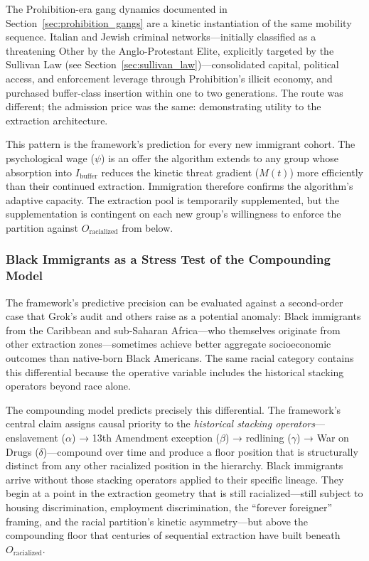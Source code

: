 The Prohibition-era gang dynamics documented in Section~\ref{sec:prohibition_gangs} are a kinetic instantiation of the same mobility sequence. Italian and Jewish criminal networks---initially classified as a threatening Other by the Anglo-Protestant Elite, explicitly targeted by the Sullivan Law (see Section~\ref{sec:sullivan_law})---consolidated capital, political access, and enforcement leverage through Prohibition's illicit economy, and purchased buffer-class insertion within one to two generations. The route was different; the admission price was the same: demonstrating utility to the extraction architecture.

This pattern is the framework's prediction for every new immigrant cohort. The psychological wage ($\psi$) is an offer the algorithm extends to any group whose absorption into $I_{\text{buffer}}$ reduces the kinetic threat gradient ($M(t)$) more efficiently than their continued extraction. Immigration therefore confirms the algorithm's adaptive capacity. The extraction pool is temporarily supplemented, but the supplementation is contingent on each new group's willingness to enforce the partition against $O_{\text{racialized}}$ from below.

\subsubsection*{Black Immigrants as a Stress Test of the Compounding Model}

The framework's predictive precision can be evaluated against a second-order case that Grok's audit and others raise as a potential anomaly: Black immigrants from the Caribbean and sub-Saharan Africa---who themselves originate from other extraction zones---sometimes achieve better aggregate socioeconomic outcomes than native-born Black Americans. The same racial category contains this differential because the operative variable includes the historical stacking operators beyond race alone.

The compounding model predicts precisely this differential. The framework's central claim assigns causal priority to the \textit{historical stacking operators}---enslavement ($\alpha$) → 13th Amendment exception ($\beta$) → redlining ($\gamma$) → War on Drugs ($\delta$)---compound over time and produce a floor position that is structurally distinct from any other racialized position in the hierarchy. Black immigrants arrive without those stacking operators applied to their specific lineage. They begin at a point in the extraction geometry that is still racialized---still subject to housing discrimination, employment discrimination, the ``forever foreigner'' framing, and the racial partition's kinetic asymmetry---but above the compounding floor that centuries of sequential extraction have built beneath $O_{\text{racialized}}$.


